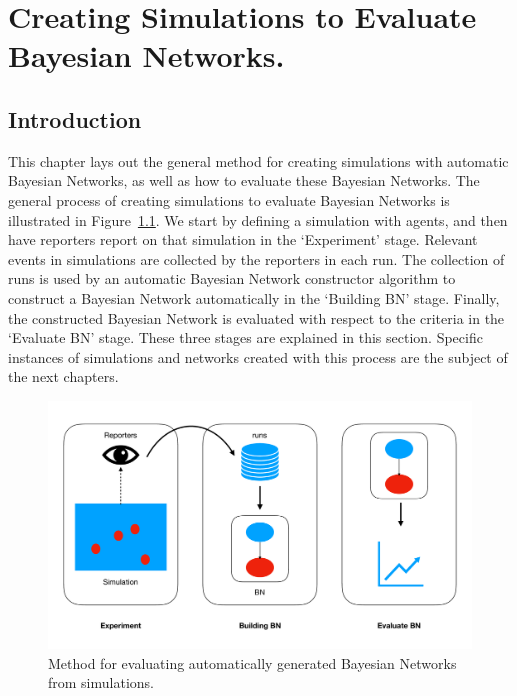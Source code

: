  

\chapter[Simulations to Evaluate Bayesian Networks.]{Creating Simulations to Evaluate Bayesian Networks.}

\section{Introduction}

This chapter lays out the general method for creating simulations with automatic Bayesian Networks, as well as how to evaluate these Bayesian Networks. The general process of creating simulations to evaluate Bayesian Networks is illustrated in Figure~\ref{pipeline}. We start by defining a simulation with agents, and then have reporters report on that simulation in the `Experiment' stage. Relevant events in simulations are collected by the reporters in each run. The collection of runs is used by an automatic Bayesian Network constructor algorithm to construct a Bayesian Network automatically in the `Building BN' stage. Finally, the constructed Bayesian Network is evaluated with respect to the criteria in the `Evaluate BN' stage. These three stages are explained in this section. Specific instances of simulations and networks created with this process are the subject of the next chapters.

\begin{figure}[h]
\includegraphics[width=\linewidth]{images/pipeline.pdf}
\caption{Method for evaluating automatically generated Bayesian Networks from simulations.}
\label{pipeline}
\end{figure}


